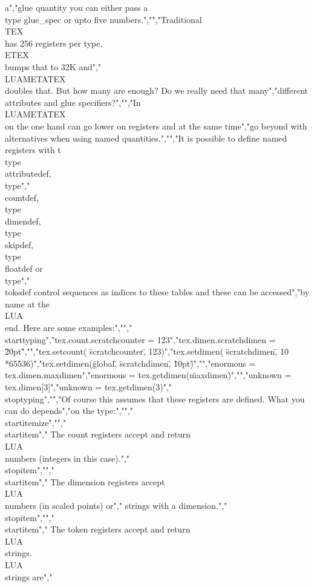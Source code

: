 a","glue quantity you can either pass a \\type {glue_spec} or upto five numbers.","","Traditional \\TEX\\ has 256 registers per type, \\ETEX\\ bumps that to 32K and","\\LUAMETATEX\\ doubles that. But how many are enough? Do we really need that many","different attributes and glue specifiers?","","In \\LUAMETATEX\\ on the one hand can go lower on registers and at the same time","go beyond with alternatives when using named quantities.","","It is possible to define named registers with t\\type {\\attributedef}, \\type","{\\countdef}, \\type {\\dimendef}, \\type {\\skipdef}, \\type {\\floatdef} or \\type","{\\toksdef} control sequences as indices to these tables and these can be accessed","by name at the \\LUA\\ end. Here are some examples:","","\\starttyping","tex.count.scratchcounter = 123","tex.dimen.scratchdimen   = \"20pt\"","","tex.setcount(          \"scratchcounter\", 123)","tex.setdimen(          \"scratchdimen\",   10 *65536)","tex.setdimen(\"global\", \"scratchdimen\",   \"10pt\")","","enormous = tex.dimen.maxdimen","enormous = tex.getdimen(\"maxdimen\")","","unknown = tex.dimen[3]","unknown = tex.getdimen(3)","\\stoptyping","","Of course this assumes that these registers are defined. What you can do depends","on the type:","","\\startitemize","","    \\startitem","        The count registers accept and return \\LUA\\ numbers (integers in this case).","    \\stopitem","","    \\startitem","        The dimension registers accept \\LUA\\ numbers (in scaled points) or","        strings with a dimension.","    \\stopitem","","    \\startitem","        The token registers accept and return \\LUA\\ strings. \\LUA\\ strings are","        